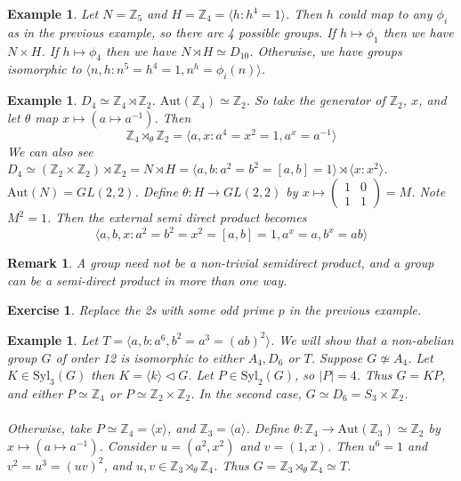 \documentclass[a4paper,10pt]{article}
\newcommand{\ZZ}{\mathbb{Z}}
\newtheorem{eg}[thm]{Example}
\newtheorem{Ex}[thm]{Exercise}
\newtheorem{rem}[thm]{Remark}
\begin{document}
\begin{eg}
Let $N = \ZZ_5$ and $H = \ZZ_4 = \langle h : h^4 = 1 \rangle$. Then $h$ could map to any $\phi_i$ as in the previous example, so there are 4 possible groups. If $h \mapsto \phi_1$ then we have $N \times H$. If $h \mapsto \phi_4$ then we have $N \rtimes H \simeq D_{10}$. Otherwise, we have groups isomorphic to $\langle n,h : n^5 = h^4 = 1, n^h = \phi_i(n) \rangle$.  
\end{eg}


\begin{eg}
$D_4 \simeq \ZZ_4 \rtimes \ZZ_2$. $\text{Aut}(\ZZ_4) \simeq \ZZ_2$. So take the generator of $\ZZ_2$, $x$, and let $\theta$ map $x \mapsto (a \mapsto a^{-1})$. Then
\[ \ZZ_4 \rtimes_\theta \ZZ_2 = \langle a, x : a^4 = x^2 = 1, a^x = a^{-1} \rangle \]
We can also see $D_4 \simeq (\ZZ_2 \times \ZZ_2) \rtimes \ZZ_2 = N \rtimes H = \langle a,b : a^2 = b^2 = [a,b] = 1 \rangle \rtimes \langle x : x^2 \rangle$. $\text{Aut}(N) = GL(2,2)$. Define $\theta: H \rightarrow GL(2,2)$ by $x \mapsto \begin{pmatrix} 1 & 0 \\ 1 & 1 \end{pmatrix} = M$. Note $M^2 = 1$. Then the external semi direct product becomes
\[ \langle a,b,x : a^2 = b^2 = x^2 = [a,b] = 1, a^x = a, b^x = ab \rangle \]
\end{eg}

\begin{rem}
A group need not be a non-trivial semidirect product, and a group can be a semi-direct product in more than one way.
\end{rem}

\begin{Ex}
Replace the 2s with some odd prime $p$ in the previous example.
\end{Ex}

\begin{eg}
Let $T = \langle a, b : a^6, b^2 = a^3 = (ab)^2 \rangle$. We will show that a non-abelian group $G$ of order 12 is isomorphic to either $A_4, D_6$ or $T$. Suppose $G \not\simeq A_4$. Let $K \in \text{Syl}_3(G)$ then $K = \langle k \rangle \triangleleft G$. Let $P \in \text{Syl}_2(G)$, so $|P| = 4$. Thus $G = KP$, and either $P \simeq \ZZ_4$ or $P \simeq \ZZ_2 \times \ZZ_2$. In the second case, $G \simeq D_6 = S_3 \times \ZZ_2$. \\
\\
Otherwise, take $P \simeq \ZZ_4 = \langle x \rangle$, and $\ZZ_3 = \langle a \rangle$. Define $\theta : \ZZ_4 \rightarrow \text{Aut}(\ZZ_3) \simeq \ZZ_2$ by $x \mapsto (a \mapsto a^{-1})$. Consider $u = (a^2, x^2)$ and $v = (1,x)$. Then $u^6 = 1$ and $v^2 = u^3 = (uv)^2$, and $u,v \in \ZZ_3 \rtimes_\theta \ZZ_4$. Thus $G = \ZZ_3 \rtimes_\theta \ZZ_4 \simeq T$. 
\end{eg}
\end{document}
